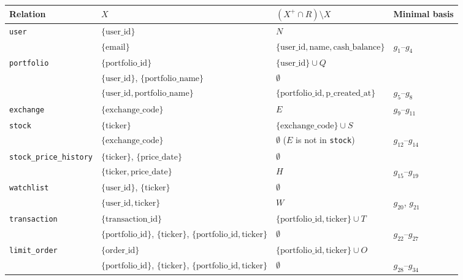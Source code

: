 \documentclass{article}
\newcommand{\at}[1]{\text{#1}}
\newcommand{\gr}[2]{g_{#1}\text{--}g_{#2}}
\begin{document}
\begin{center}
\begin{tabular}{l l l l}
  \toprule
  \textbf{Relation} & $X$ & $(X^+ \cap R) \setminus X$ & \textbf{Minimal basis} \\
  \midrule
  \texttt{user} & $\{\at{user\_id}\}$ & $N$ & \\
                & $\{\at{email}\}$ & $\{\at{user\_id}, \at{name}, \at{cash\_balance}\}$ & $\gr{1}{4}$ \\
  \midrule
  \texttt{portfolio} & $\{\at{portfolio\_id}\}$ & $\{\at{user\_id}\} \cup Q$ & \\
                     & $\{\at{user\_id}\}$, $\{\at{portfolio\_name}\}$ & $\emptyset$ & \\
                     & $\{\at{user\_id}, \at{portfolio\_name}\}$ & $\{\at{portfolio\_id}, \at{p\_created\_at}\}$ & $\gr{5}{8}$ \\
  \midrule
  \texttt{exchange} & $\{\at{exchange\_code}\}$ & $E$ & $\gr{9}{11}$ \\
  \midrule
  \texttt{stock} & $\{\at{ticker}\}$ & $\{\at{exchange\_code}\} \cup S$ & \\
                 & $\{\at{exchange\_code}\}$ & $\emptyset$ ($E$ is not in \texttt{stock}) & $\gr{12}{14}$ \\
  \midrule
  \texttt{stock\_price\_history} & $\{\at{ticker}\}$, $\{\at{price\_date}\}$ & $\emptyset$ & \\
                                 & $\{\at{ticker}, \at{price\_date}\}$ & $H$ & $\gr{15}{19}$ \\
  \midrule
  \texttt{watchlist} & $\{\at{user\_id}\}$, $\{\at{ticker}\}$ & $\emptyset$ & \\
                     & $\{\at{user\_id}, \at{ticker}\}$ & $W$ & $g_{20}$, $g_{21}$ \\
  \midrule
  \texttt{transaction} & $\{\at{transaction\_id}\}$ & $\{\at{portfolio\_id}, \at{ticker}\} \cup T$ & \\
                       & $\{\at{portfolio\_id}\}$, $\{\at{ticker}\}$, $\{\at{portfolio\_id}, \at{ticker}\}$ & $\emptyset$ & $\gr{22}{27}$ \\
  \midrule
  \texttt{limit\_order} & $\{\at{order\_id}\}$ & $\{\at{portfolio\_id}, \at{ticker}\} \cup O$ & \\
                        & $\{\at{portfolio\_id}\}$, $\{\at{ticker}\}$, $\{\at{portfolio\_id}, \at{ticker}\}$ & $\emptyset$ & $\gr{28}{34}$ \\
  \bottomrule
\end{tabular}
\end{center}
\end{document}
